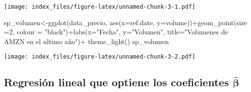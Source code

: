 \documentclass[
]{book}
\newenvironment{Shaded}{\begin{snugshade}}{\end{snugshade}}
\newcommand{\AttributeTok}[1]{\textcolor[rgb]{0.77,0.63,0.00}{#1}}
\newcommand{\DecValTok}[1]{\textcolor[rgb]{0.00,0.00,0.81}{#1}}
\newcommand{\FunctionTok}[1]{\textcolor[rgb]{0.00,0.00,0.00}{#1}}
\newcommand{\NormalTok}[1]{#1}
\newcommand{\OtherTok}[1]{\textcolor[rgb]{0.56,0.35,0.01}{#1}}
\newcommand{\SpecialCharTok}[1]{\textcolor[rgb]{0.00,0.00,0.00}{#1}}
\newcommand{\StringTok}[1]{\textcolor[rgb]{0.31,0.60,0.02}{#1}}
\begin{document}
\texttt{[image: index\_files/figure-latex/unnamed-chunk-3-1.pdf]}

\begin{Shaded}
\begin{Highlighting}[]

\NormalTok{sp\_volumen}\OtherTok{\textless{}{-}}\FunctionTok{ggplot}\NormalTok{(data\_precio, }\FunctionTok{aes}\NormalTok{(}\AttributeTok{x=}\NormalTok{ref.date, }\AttributeTok{y=}\NormalTok{volume))}\SpecialCharTok{+}\FunctionTok{geom\_point}\NormalTok{(}\AttributeTok{size =}\DecValTok{2}\NormalTok{, }\AttributeTok{colour =} \StringTok{"black"}\NormalTok{)}\SpecialCharTok{+}\FunctionTok{labs}\NormalTok{(}\AttributeTok{x=}\StringTok{"Fecha"}\NormalTok{, }\AttributeTok{y=}\StringTok{"Volumen"}\NormalTok{, }\AttributeTok{title=}\StringTok{"Volumenes de AMZN en el ultimo año"}\NormalTok{)}\SpecialCharTok{+} \FunctionTok{theme\_light}\NormalTok{()}
\NormalTok{sp\_volumen}
\end{Highlighting}
\end{Shaded}

\texttt{[image: index\_files/figure-latex/unnamed-chunk-3-2.pdf]}

\hypertarget{regresiuxf3n-lineal-que-optiene-los-coeficientes-hatboldsymbol-beta}{%
\subsection{\texorpdfstring{Regresión lineal que optiene los coeficientes \(\hat{\boldsymbol \beta}\)}{Regresión lineal que optiene los coeficientes \textbackslash hat\{\textbackslash boldsymbol \textbackslash beta\}}}\label{regresiuxf3n-lineal-que-optiene-los-coeficientes-hatboldsymbol-beta}}
\end{document}
